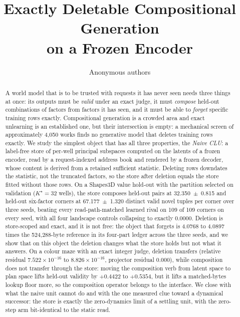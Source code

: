 \documentclass{article}
\title{Exactly Deletable Compositional Generation\\ on a Frozen Encoder}
\author{Anonymous authors}
\newcommand{\sci}[2]{\ensuremath{#1\times10^{#2}}}
\newcommand{\Kstar}{\ensuremath{K^{\star}}}
\begin{document}
\maketitle

\begin{abstract}
A world model that is to be trusted with requests it has never seen needs three things at
once: its outputs must be \emph{valid} under an exact judge, it must \emph{compose}
held-out combinations of factors from factors it has seen, and it must be able to
\emph{forget} specific training rows exactly. Compositional generation is a crowded area
and exact unlearning is an established one, but their intersection is empty: a mechanical
screen of approximately 4,050 works finds no generative model that deletes training rows
exactly.
We study the simplest object that has all three properties, the \emph{Naive CLU}: a
label-free store of per-well principal subspaces computed on the latents of a frozen
encoder, read by a request-indexed address book and rendered by a frozen decoder, whose
content is derived from a retained sufficient statistic. Deleting rows downdates the
statistic, not the truncated factors, so the store after deletion equals the store fitted
without those rows. On a Shapes3D value hold-out with the partition selected on
validation ($\Kstar=32$ wells), the store composes held-out pairs at 32.350~$\pm$~0.815 and
held-out six-factor corners at 67.177~$\pm$~1.320 distinct valid novel tuples per corner over
three seeds, beating every read-path-matched learned rival on 109 of 109 corners on every
seed, with all four landscape controls collapsing to exactly 0.0000.
Deletion is store-scoped and exact, and it is not free: the object that forgets is 4.0768 to
4.0897 times the 524,288-byte reference in its four-part ledger across the three seeds, and we
show that on this object the deletion changes what the store holds but not what it answers.
On a colour maze with an exact integer judge, deletion transfers
(relative residual \sci{7.522}{-16} to \sci{8.826}{-16}, projector residual 0.000),
while composition does not transfer through the store: moving the composition verb from
latent space to plan space lifts held-out validity by $+0.4422$ to $+0.5354$, but it lifts a
matched-bytes lookup floor more, so the composition operator belongs to the interface.
We close with what the naive unit cannot do and with the one measured clue toward a
dynamical successor: the store is exactly the zero-dynamics limit of a settling unit, with
the zero-step arm bit-identical to the static read.
\end{abstract}
\end{document}
